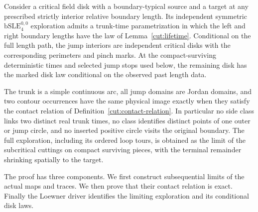 \begin{proposition}\label{cut:critical-cutting}
Consider a critical field disk with a boundary-typical source and a target
at any prescribed strictly interior relative boundary length.  Its independent
symmetric \(\mathrm{bSLE}^{0,0}_4\) exploration admits a trunk-time
parametrization in which the left and right boundary lengths have the law of
Lemma~\ref{cut:lifetime}.  Conditional on the full length path, the jump
interiors are independent critical disks with the corresponding perimeters
and pinch marks.  At the compact-surviving deterministic times and selected
jump stops used below, the remaining disk has the marked disk law conditional
on the observed past length data.

The trunk is a simple continuous arc, all jump domains are Jordan domains,
and two contour occurrences have the same physical image exactly when
they satisfy the contact relation of Definition~\ref{cut:contact-relation}.  In particular no side class links two distinct real trunk times,
no class identifies distinct points of one outer or jump circle, and no
inserted positive circle visits the original boundary.  The full exploration,
including its ordered loop tours, is obtained as the limit of the subcritical
cuttings on compact surviving pieces, with the terminal remainder shrinking
spatially to the target.
\end{proposition}
The proof has three components.  We first construct subsequential limits
of the actual maps and traces.  We then prove that their contact relation
is exact.  Finally the Loewner driver identifies the limiting exploration
and its conditional disk laws.

